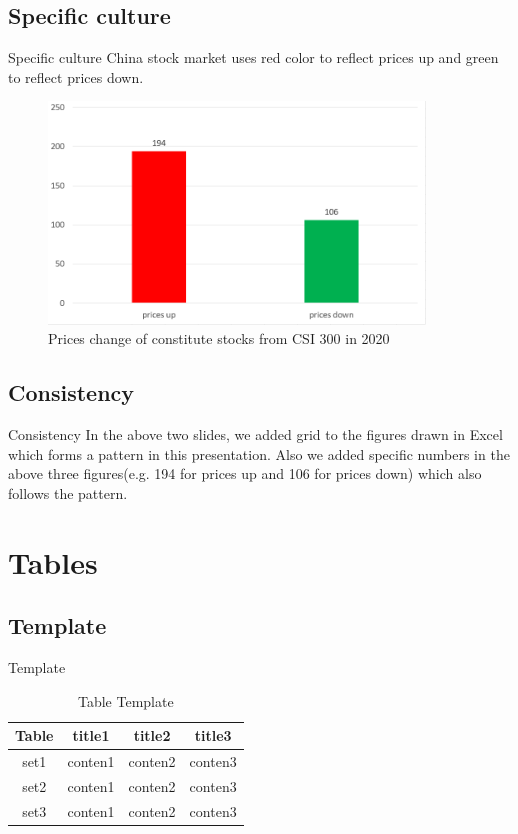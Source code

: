 \documentclass[11pt]{beamer}
\begin{document}
\subsection{Specific culture}
\begin{frame}{Specific culture}
China stock market uses red color to reflect prices up and green to reflect prices down.  
    \begin{figure}
        \centering
        \includegraphics[width = 10cm]{stock.PNG}
        \caption{Prices change of constitute stocks from CSI 300 in 2020}
        \label{fig:my_label}
    \end{figure}
\end{frame}

\subsection{Consistency}
\begin{frame}{Consistency}
    In the above two slides, we added grid to the figures drawn in Excel which forms a pattern in this presentation. Also we added specific numbers in the above three figures(e.g. 194 for prices up and 106 for prices down) which also follows the pattern.
\end{frame}

\section{Tables}
\subsection{Template}
\begin{frame}{Template}
\begin{table}[htbp]
\centering
\begin{tabular}{|c|c|c|c|}
\hline
Table&title1&title2&title3\\ 
\hline
set1&conten1&conten2&conten3\\ 
\hline 
set2&conten1&conten2&conten3\\ 
\hline 
set3&conten1&conten2&conten3\\
\hline
\end{tabular}
\caption{Table Template}
\end{table}
\end{frame}
\end{document}
